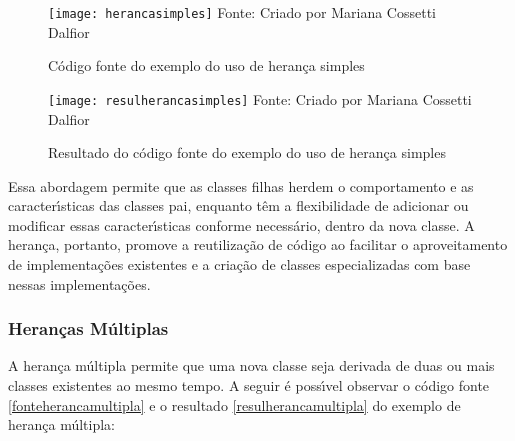 \begin{figure}[H]
	\begin{center}
		\caption{C\'{o}digo fonte do exemplo do uso de heran\c{c}a simples} \label{fonteherancasimples}
		\texttt{[image: herancasimples]} 
		\newline
		Fonte: Criado por Mariana Cossetti Dalfior
	\end{center}
\end{figure}

\begin{figure}[H]
	\begin{center}
		\caption{Resultado do c\'{o}digo fonte do exemplo do uso de heran\c{c}a simples} \label{resulherancasimples}
		\texttt{[image: resulherancasimples]} 
		\newline
		Fonte: Criado por Mariana Cossetti Dalfior
	\end{center}
\end{figure}

Essa abordagem permite que as classes filhas herdem o comportamento e as caracter\'{\i}sticas das classes pai, enquanto t\^{e}m a flexibilidade de adicionar ou modificar essas caracter\'{\i}sticas conforme necess\'{a}rio, dentro da nova classe. A heran\c{c}a, portanto, promove a reutiliza\c{c}\~{a}o de c\'{o}digo ao facilitar o aproveitamento de implementa\c{c}\~{o}es existentes e a cria\c{c}\~{a}o de classes especializadas com base nessas implementa\c{c}\~{o}es.

		\subsubsection{Heran\c{c}as M\'{u}ltiplas}
A heran\c{c}a m\'{u}ltipla permite que uma nova classe seja derivada de duas ou mais classes existentes ao mesmo tempo. A seguir \'{e} poss\'{\i}vel observar o c\'{o}digo fonte \ref{fonteherancamultipla} e o resultado \ref{resulherancamultipla} do exemplo de heran\c{c}a m\'{u}ltipla:

